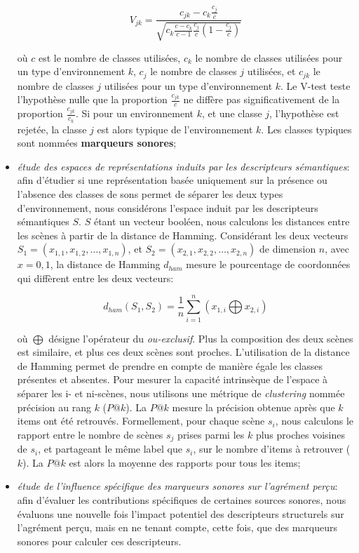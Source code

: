 \begin{itemize}
\begin{equation*}
V_{jk}=\dfrac{c_{jk}-c_k\frac{c_j}{c}}{\sqrt{c_k\frac{c-c_k}{c-1}\frac{c_j}{c}(1-\frac{c_j}{c})}}
\end{equation*}

où $c$ est le nombre de classes utilisées, $c_k$ le nombre de classes utilisées pour un type d'environnement $k$, $c_j$ le nombre de classes $j$ utilisées, et $c_{jk}$ le nombre de classes $j$ utilisées pour un type d'environnement $k$. Le V-test teste l'hypothèse nulle que la proportion $\frac{c_{jk}}{c}$ ne diffère pas significativement de la proportion $\frac{c_{jk}}{c_k}$. Si pour un environnement $k$, et une classe $j$, l'hypothèse est rejetée, la classe $j$ est alors typique de l'environnement $k$. Les classes typiques sont nommées \textbf{marqueurs sonores};

\item \emph{étude des espaces de représentations induits par les descripteurs sémantiques}: afin d'étudier si une représentation basée uniquement sur la présence ou l'absence des classes de sons permet de séparer les deux types d'environnement, nous considérons l'espace induit par les descripteurs sémantiques $S$. $S$ étant un vecteur booléen, nous calculons les distances entre les scènes à partir de la distance de Hamming. Considérant les deux vecteurs $S_1=(x_{1,1},x_{1,2},\ldots,x_{1,n})$, et $S_2=(x_{2,1},x_{2,2},\ldots,x_{2,n})$ de dimension $n$, avec $x={0,1}$, la distance de Hamming $d_{ham}$ mesure le pourcentage de coordonnées qui diffèrent entre les deux vecteurs:   


\begin{equation*}
d_{ham}(S_1,S_2)=\dfrac{1}{n}\sum_{i=1}^{n} (x_{1,i} \bigoplus x_{2,i})
\end{equation*}

où $\bigoplus$ désigne l'opérateur du \emph{ou-exclusif}. Plus la composition des deux scènes est similaire, et plus ces deux scènes sont proches. L'utilisation de la distance de Hamming permet de prendre en compte de manière égale les classes présentes et absentes. Pour mesurer la capacité intrinsèque de l'espace à séparer les i- et ni-scènes, nous utilisons une métrique de \emph{clustering} nommée précision au rang $k$ ($P@k$). La $P@k$ mesure la précision obtenue après que $k$ items ont été retrouvés. Formellement, pour chaque scène $s_i$, nous calculons le rapport entre le nombre de scènes $s_j$ prises parmi les $k$ plus proches voisines de $s_i$, et  partageant le même label que $s_i$, sur le nombre d'items à retrouver ($k$). La $P@k$ est alors la moyenne des rapports pour tous les items;

\item \emph{étude de l'influence spécifique des marqueurs sonores sur l'agrément perçu}: afin d'évaluer les contributions spécifiques de certaines sources sonores, nous évaluons une nouvelle fois l'impact potentiel des descripteurs structurels sur l'agrément perçu, mais en ne tenant compte, cette fois, que des marqueurs sonores pour calculer ces descripteurs.
\end{itemize}

